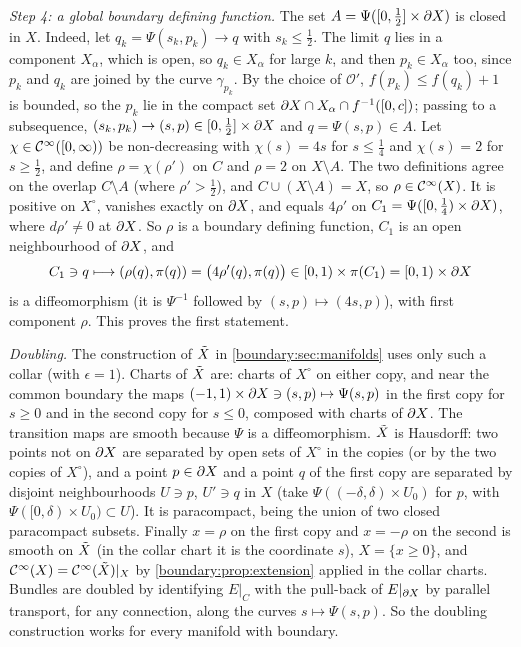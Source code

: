 \emph{Step 4: a global boundary defining function.} The set
$A=\Psi([0,\frac12]\times\partial X)$ is closed in $X$. Indeed, let $q_k=\Psi(s_k,p_k)\to q$
with $s_k\le\frac12$. The limit $q$ lies in a component $X_\alpha$, which is open, so
$q_k\in X_\alpha$ for large $k$, and then $p_k\in X_\alpha$ too, since $p_k$ and $q_k$ are
joined by the curve $\gamma_{p_k}$. By the choice of $\mathcal O'$, $f(p_k)\le f(q_k)+1$
is bounded, so the $p_k$ lie in the compact set $\partial X\cap X_\alpha\cap f^{-1}([0,c])$; passing to a subsequence,
$(s_k,p_k)\to(s,p)\in[0,\frac12]\times\partial X$ and $q=\Psi(s,p)\in A$. Let
$\chi\in\mathcal{C}^\infty([0,\infty))$ be non-decreasing with $\chi(s)=4s$ for $s\le\frac14$ and
$\chi(s)=2$ for $s\ge\frac12$, and define $\rho=\chi(\rho')$ on $C$ and $\rho=2$ on
$X\setminus A$. The two definitions agree on the overlap $C\setminus A$ (where
$\rho'>\frac12$), and $C\cup(X\setminus A)=X$, so $\rho\in\mathcal{C}^\infty(X)$. It is positive on
$X^\circ$, vanishes exactly on $\partial X$, and equals $4\rho'$ on
$C_1=\Psi([0,\frac14)\times\partial X)$, where $d\rho'\ne0$ at $\partial X$. So $\rho$ is a boundary
defining function, $C_1$ is an open neighbourhood of $\partial X$, and
\begin{equation*}
C_1\ni q\longmapsto(\rho(q),\pi(q))=\big(4\rho'(q),\pi(q)\big)\in[0,1)\times\pi(C_1)=
[0,1)\times\partial X
\end{equation*}
is a diffeomorphism (it is $\Psi^{-1}$ followed by $(s,p)\mapsto(4s,p)$), with first
component $\rho$. This proves the first statement.

\emph{Doubling.} The construction of $\tilde{X}$ in \cref{boundary:sec:manifolds} uses only
such a collar (with $\epsilon=1$). Charts of $\tilde{X}$ are: charts of $X^\circ$ on either copy,
and near the common boundary the maps $(-1,1)\times\partial X\ni(s,p)\mapsto\Psi(s,p)$ in the
first copy for $s\ge0$ and in the second copy for $s\le0$, composed with charts of $\partial X$.
The transition maps are smooth because $\Psi$ is a diffeomorphism. $\tilde{X}$ is Hausdorff: two
points not on $\partial X$ are separated by open sets of $X^\circ$ in the copies (or by the two
copies of $X^\circ$), and a point $p\in\partial X$ and a point $q$ of the first copy are
separated by disjoint neighbourhoods $U\ni p$, $U'\ni q$ in $X$ (take $\Psi((-\delta,\delta)
\times U_0)$ for $p$, with $\Psi([0,\delta)\times U_0)\subset U$). It is paracompact,
being the union of two closed paracompact subsets. Finally $x=\rho$ on the first copy and
$x=-\rho$ on the second is smooth on $\tilde{X}$ (in the collar chart it is the coordinate
$s$), $X=\{x\ge0\}$, and $\mathcal{C}^\infty(X)=\mathcal{C}^\infty(\tilde{X})|_X$ by \cref{boundary:prop:extension} applied in
the collar charts. Bundles are doubled by identifying $E|_C$ with the pull-back of
$E|_{\partial X}$ by parallel transport, for any connection, along the curves
$s\mapsto\Psi(s,p)$. So the doubling construction works for every manifold with boundary.

